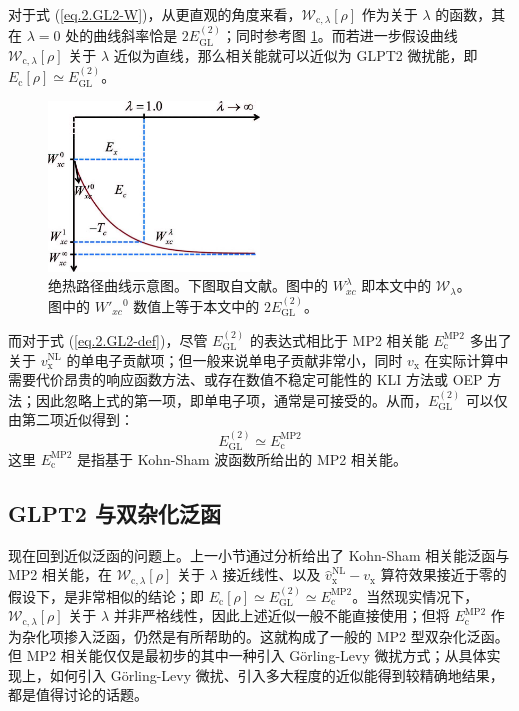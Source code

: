 对于式 (\ref{eq.2.GL2-W})，从更直观的角度来看，$\mathcal{W}_{\mathrm{c}, \lambda} [\rho]$ 作为关于 $\lambda$ 的函数，其在 $\lambda = 0$ 处的曲线斜率恰是 $2 E_\mathrm{GL}^{(2)}$；同时参考图 \ref{fig.2.adiabatic-curve}。而若进一步假设曲线 $\mathcal{W}_{\mathrm{c}, \lambda} [\rho]$ 关于 $\lambda$ 近似为直线，那么相关能就可以近似为 GLPT2 微扰能，即 $E_\mathrm{c} [\rho] \simeq E_\mathrm{GL}^{(2)}$。

\begin{figure}[h]
  \centering
  \includegraphics[width=0.5\textwidth]{assets/adiabatic-curve.jpg}
  \caption{绝热路径曲线示意图。下图取自文献\cite{Su-Xu.JCP.2014}。图中的 $W_{xc}^{\lambda}$ 即本文中的 $\mathcal{W}_{\lambda}$。图中的 $W'_{xc}{}^{0}$ 数值上等于本文中的 $2 E_\mathrm{GL}^{(2)}$。}
  \label{fig.2.adiabatic-curve}
\end{figure}

而对于式 (\ref{eq.2.GL2-def})，尽管 $E_\mathrm{GL}^{(2)}$ 的表达式相比于 MP2 相关能 $E_\mathrm{c}^\mathrm{MP2}$ 多出了关于 $v_\mathrm{x}^\mathrm{NL}$ 的单电子贡献项；但一般来说单电子贡献非常小\cite{DellaSala-Goerling.JCP.2001}，同时 $v_\mathrm{x}$ 在实际计算中需要代价昂贵的响应函数方法\cite{Goerling-Goerling.PRL.1999}、或存在数值不稳定可能性的 KLI 方法\cite{Krieger-Iafrate.PRA.1992, DellaSala-Goerling.JCP.2001}或 OEP 方法\cite{Mori-Sanchez-Yang.JCP.2005}；因此忽略上式的第一项，即单电子项，通常是可接受的。从而，$E_\mathrm{GL}^{(2)}$ 可以仅由第二项近似得到：
\begin{equation}
  E_\mathrm{GL}^{(2)} \simeq E_\mathrm{c}^\mathrm{MP2}
\end{equation}
这里 $E_\mathrm{c}^\mathrm{MP2}$ 是指基于 Kohn-Sham 波函数所给出的 MP2 相关能。

\subsection{GLPT2 与双杂化泛函}
\label{sec.2.glpt2-dh}

现在回到近似泛函的问题上。上一小节通过分析给出了 Kohn-Sham 相关能泛函与 MP2 相关能，在 $\mathcal{W}_{\mathrm{c}, \lambda} [\rho]$ 关于 $\lambda$ 接近线性、以及 $\hat v_\mathrm{x}^\mathrm{NL} - v_\mathrm{x}$ 算符效果接近于零的假设下，是非常相似的结论；即 $E_\mathrm{c} [\rho] \simeq E_\mathrm{GL}^{(2)} \simeq E_\mathrm{c}^\mathrm{MP2}$。当然现实情况下，$\mathcal{W}_{\mathrm{c}, \lambda} [\rho]$ 关于 $\lambda$ 并非严格线性，因此上述近似一般不能直接使用；但将 $E_\mathrm{c}^\mathrm{MP2}$ 作为杂化项掺入泛函，仍然是有所帮助的。这就构成了一般的 MP2 型双杂化泛函。但 MP2 相关能仅仅是最初步的其中一种引入 G\"orling-Levy 微扰方式；从具体实现上，如何引入 G\"orling-Levy 微扰、引入多大程度的近似能得到较精确地结果，都是值得讨论的话题。


